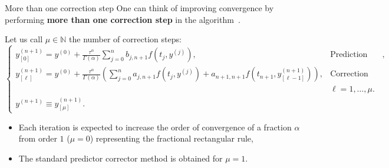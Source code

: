 \documentclass[aspectratio=169,xcolor=dvipsnames]{beamer}
\begin{document}
\begin{frame}{More than one correction step}
One can think of improving convergence by performing \textbf{more than one correction step} in the algorithm~\parencite{PredictorCorrector}.

Let us call $\mu \in \mathbb{N}$ the number of correction steps:
\[
\begin{cases}
y^{(n+1)}_{[0]} = y^{(0)} + \frac{\tau^\alpha}{\Gamma(\alpha)} \sum_{j=0}^{n} b_{j,n+1} f(t_j,y^{(j)}), & \text{Prediction step},\\
y^{(n+1)}_{[\ell]} = y^{(0)} + \frac{\tau^\alpha}{\Gamma(\alpha)} \left( \sum_{j=0}^{n} a_{j,n+1} f(t_j,y^{(j)}) + a_{n+1,n+1}f(t_{n+1},y^{(n+1)}_{[\ell-1]}) \right), & \text{Correction steps }\\
& \ell=1,\ldots,\mu.\\
y^{(n+1)} \equiv y^{(n+1)}_{[\mu]}. 
\end{cases}
\]
\begin{itemize}
	\item[\faBrain]<2-> Each iteration is expected to increase the order of convergence of a fraction $\alpha$ from order $1$ ($\mu = 0$) representing the fractional rectangular rule,
	\item[\faBrain]<3-> The standard predictor corrector method is obtained for $\mu = 1$.
\end{itemize}

\end{frame}
\end{document}
